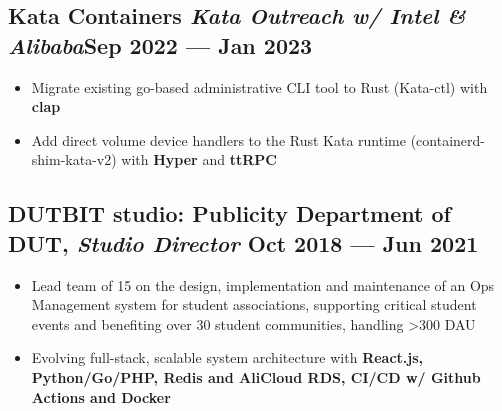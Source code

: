 \documentclass[a4,12pt]{article}
\newenvironment{zitemize}{
\begin{itemize}\itemsep0pt \parskip0pt \parsep1pt}
{\end{itemize}\vspace{-0.5cm}}
\begin{document}
\vspace{-0.2cm}

\subsection*{Kata Containers \normalfont\textit{Kata Outreach w/ Intel \& Alibaba}\hfill \textbf{Sep 2022 --- Jan 2023}} 
\begin{zitemize}
    \item Migrate existing go-based administrative CLI tool to Rust (Kata-ctl) with \textbf{clap}
    \item Add direct volume device handlers to the Rust Kata runtime (containerd-shim-kata-v2) with \textbf{Hyper} and \textbf{ttRPC}
\end{zitemize}


\vspace{-0.1cm}

\subsection*{DUTBIT studio: {\normalsize\normalfont Publicity Department of DUT, \textit{Studio Director}} \hfill  Oct 2018 --- Jun 2021} 

    \begin{zitemize}
        \item Lead team of 15 on the design, implementation and maintenance of an Ops Management system for student associations, supporting critical student events and benefiting over 30 student communities, handling >300 DAU
        \item Evolving full-stack, scalable system architecture with \textbf{React.js, Python/Go/PHP, Redis and AliCloud RDS, CI/CD w/ Github Actions and Docker}
    \end{zitemize}

\end{document}
